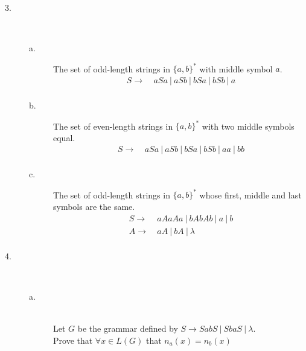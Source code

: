 \documentclass{article}
\begin{document}
\begin{description}
\begin{description}
  \end{description}

\item[3.]\hfill \\
  \begin{description}
  \item[a.]
    The set of odd-length strings in $\{a,b\}^*$ with middle symbol $a$.
    \begin{align*}
      S \rightarrow&~ aSa ~|~ aSb ~|~ bSa ~|~ bSb ~|~ a\\
    \end{align*}

  \item[b.]
    The set of even-length strings in $\{a,b\}^*$ with two middle symbols equal.
    \begin{align*}
      S \rightarrow&~ aSa ~|~ aSb ~|~ bSa ~|~ bSb ~|~ aa ~|~ bb\\
    \end{align*}
    
  \item[c.]
    The set of odd-length strings in $\{a,b\}^*$ whose first, middle and last symbols are the same.
    \begin{align*}
      S \rightarrow&~ aAaAa ~|~ bAbAb ~|~ a ~|~ b\\
      A \rightarrow&~ aA ~|~ bA ~|~ \lambda\\
    \end{align*}
  \end{description}

\item[4.]\hfill \\
  \begin{description}
  \item[a.]\hfill \\
    Let $G$ be the grammar defined by $S \rightarrow SabS ~|~ SbaS ~|~ \lambda$.\\
    Prove that $\forall x \in L(G)$ that $n_a(x) = n_b(x)$
    

\end{description}
\end{description}
\end{document}
